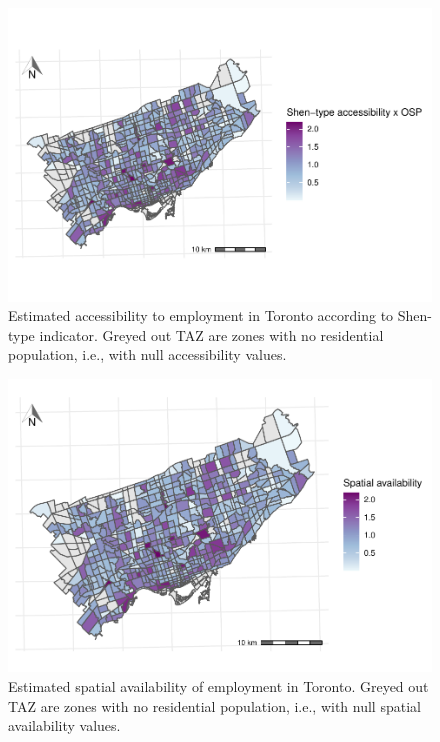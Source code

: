 \documentclass[]{elsarticle} %
\begin{document}
\begin{figure}
\includegraphics[width=1\linewidth]{Spatial-Availability-Refreshed_files/figure-latex/per-capita-accessibility-plot-a_i-1} \caption{\label{fig:plot-Shen-type-A-TO}Estimated accessibility to employment in Toronto according to Shen-type indicator. Greyed out TAZ are zones with no residential population, i.e., with null accessibility values.}\label{fig:per-capita-accessibility-plot-a_i}
\end{figure}

\begin{figure}
\includegraphics[width=1\linewidth]{Spatial-Availability-Refreshed_files/figure-latex/per-capita-accessibility-plot-v_i-1} \caption{\label{fig:plot-SA-TO}Estimated spatial availability of employment in Toronto. Greyed out TAZ are zones with no residential population, i.e., with null spatial availability values.}\label{fig:per-capita-accessibility-plot-v_i}
\end{figure}
\end{document}
